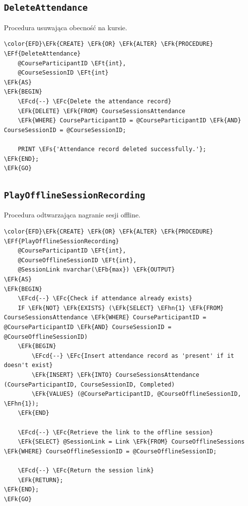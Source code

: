 \documentclass[11pt]{article}
\newcommand{\EFc}[1]{\textcolor{EFc}{\textit{#1}}} %
\newcommand{\EFcd}[1]{\textcolor{EFcd}{\textit{#1}}} %
\newcommand{\EFs}[1]{\textcolor{EFs}{#1}} %
\newcommand{\EFk}[1]{\textcolor{EFk}{\textbf{#1}}} %
\newcommand{\EFb}[1]{\textcolor{EFb}{\textbf{#1}}} %
\newcommand{\EFf}[1]{\textcolor{EFf}{#1}} %
\newcommand{\EFt}[1]{\textcolor{EFt}{\textbf{#1}}} %
\newcommand{\EFhn}[1]{\textcolor{EFhn}{#1}} %
\begin{document}
\subsection{\texttt{DeleteAttendance}}
\label{sec:orgfaf6192}
Procedura usuwająca obecność na kursie.
\begin{Code}
\begin{Verbatim}
\color{EFD}\EFk{CREATE} \EFk{OR} \EFk{ALTER} \EFk{PROCEDURE} \EFf{DeleteAttendance}
    @CourseParticipantID \EFt{int},
    @CourseSessionID \EFt{int}
\EFk{AS}
\EFk{BEGIN}
    \EFcd{--} \EFc{Delete the attendance record}
    \EFk{DELETE} \EFk{FROM} CourseSessionsAttendance
    \EFk{WHERE} CourseParticipantID = @CourseParticipantID \EFk{AND} CourseSessionID = @CourseSessionID;

    PRINT \EFs{'Attendance record deleted successfully.'};
\EFk{END};
\EFk{GO}
\end{Verbatim}
\end{Code}
\subsection{\texttt{PlayOfflineSessionRecording}}
\label{sec:orgdf9d3c7}
Procedura odtwarzająca nagranie sesji offline.
\begin{Code}
\begin{Verbatim}
\color{EFD}\EFk{CREATE} \EFk{OR} \EFk{ALTER} \EFk{PROCEDURE} \EFf{PlayOfflineSessionRecording}
    @CourseParticipantID \EFt{int},
    @CourseOfflineSessionID \EFt{int},
    @SessionLink nvarchar(\EFb{max}) \EFk{OUTPUT}
\EFk{AS}
\EFk{BEGIN}
    \EFcd{--} \EFc{Check if attendance already exists}
    IF \EFk{NOT} \EFk{EXISTS} (\EFk{SELECT} \EFhn{1} \EFk{FROM} CourseSessionsAttendance \EFk{WHERE} CourseParticipantID = @CourseParticipantID \EFk{AND} CourseSessionID = @CourseOfflineSessionID)
    \EFk{BEGIN}
        \EFcd{--} \EFc{Insert attendance record as 'present' if it doesn't exist}
        \EFk{INSERT} \EFk{INTO} CourseSessionsAttendance (CourseParticipantID, CourseSessionID, Completed)
        \EFk{VALUES} (@CourseParticipantID, @CourseOfflineSessionID, \EFhn{1});
    \EFk{END}

    \EFcd{--} \EFc{Retrieve the link to the offline session}
    \EFk{SELECT} @SessionLink = Link \EFk{FROM} CourseOfflineSessions \EFk{WHERE} CourseOfflineSessionID = @CourseOfflineSessionID;

    \EFcd{--} \EFc{Return the session link}
    \EFk{RETURN};
\EFk{END};
\EFk{GO}
\end{Verbatim}
\end{Code}
\end{document}
